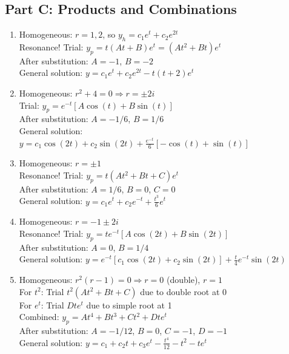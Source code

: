 \documentclass[12pt]{article}
\begin{document}
\subsection*{Part C: Products and Combinations}

\begin{enumerate}[resume]
\item Homogeneous: $r = 1, 2$, so $y_h = c_1e^t + c_2e^{2t}$\\
Resonance! Trial: $y_p = t(At + B)e^t = (At^2 + Bt)e^t$\\
After substitution: $A = -1$, $B = -2$\\
General solution: $y = c_1e^t + c_2e^{2t} - t(t + 2)e^t$

\item Homogeneous: $r^2 + 4 = 0 \Rightarrow r = \pm 2i$\\
Trial: $y_p = e^{-t}[A\cos(t) + B\sin(t)]$\\
After substitution: $A = -1/6$, $B = 1/6$\\
General solution: $y = c_1\cos(2t) + c_2\sin(2t) + \frac{e^{-t}}{6}[-\cos(t) + \sin(t)]$

\item Homogeneous: $r = \pm 1$\\
Resonance! Trial: $y_p = t(At^2 + Bt + C)e^t$\\
After substitution: $A = 1/6$, $B = 0$, $C = 0$\\
General solution: $y = c_1e^t + c_2e^{-t} + \frac{t^3}{6}e^t$

\item Homogeneous: $r = -1 \pm 2i$\\
Resonance! Trial: $y_p = te^{-t}[A\cos(2t) + B\sin(2t)]$\\
After substitution: $A = 0$, $B = 1/4$\\
General solution: $y = e^{-t}[c_1\cos(2t) + c_2\sin(2t)] + \frac{t}{4}e^{-t}\sin(2t)$

\item Homogeneous: $r^2(r - 1) = 0 \Rightarrow r = 0$ (double), $r = 1$\\
For $t^2$: Trial $t^2(At^2 + Bt + C)$ due to double root at 0\\
For $e^t$: Trial $Dte^t$ due to simple root at 1\\
Combined: $y_p = At^4 + Bt^3 + Ct^2 + Dte^t$\\
After substitution: $A = -1/12$, $B = 0$, $C = -1$, $D = -1$\\
General solution: $y = c_1 + c_2t + c_3e^t - \frac{t^4}{12} - t^2 - te^t$
\end{enumerate}
\end{document}
